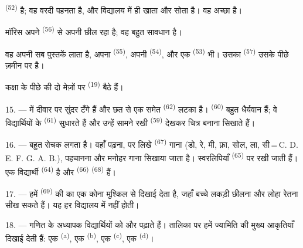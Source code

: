  \textsuperscript{(52)}  है; वह वरदी पहनता है,
और विद्यालय में ही खाता और सोता है। वह अच्छा  है।

मॉरिस अपने  \textsuperscript{(56)} से अपनी  छील रहा है;
वह बहुत सावधान है।

वह अपनी सब पुस्तकें लाता है, अपना  \textsuperscript{(55)}, अपनी
 \textsuperscript{(54)}, और एक 
\textsuperscript{(53)} भी। उसका  \textsuperscript{(57)} उसके पीछे ज़मीन पर
है।

कक्षा के पीछे की दो मेज़ों पर  \textsuperscript{(19)} बैठे
हैं।

\VUsaut{4.6mm}
\VUsaut{3.4mm}

15. ---  में दीवार पर सुंदर  टँगे हैं और
छत से एक  समेत  \textsuperscript{(62)} लटका है।
 \textsuperscript{(60)} बहुत धैर्यवान हैं; वे विद्यार्थियों के
 \textsuperscript{(61)} सुधारते हैं और उन्हें सामने रखी
 \textsuperscript{(59)} देखकर चित्र बनाना सिखाते हैं।

16. ---  बहुत रोचक लगता है। वहाँ  पढ़ना,
 पर लिखे  \textsuperscript{(67)} गाना (डो, रे, मी,
फ़ा, सोल, ला, सी\,=\,C. D. E. F. G. A. B.),  पहचानना और
मनोहर  गाना सिखाया जाता है। स्वरलिपियाँ 
\textsuperscript{(65)} पर रखी जाती हैं। एक विद्यार्थी 
\textsuperscript{(64)} है और  \textsuperscript{(66)}
 \textsuperscript{(68)} हैं।

17. --- हमें  \textsuperscript{(69)} की  का एक
कोना मुश्किल से दिखाई देता है, जहाँ बच्चे लकड़ी छीलना और लोहा रेतना सीख सकते
हैं। यह हर विद्यालय में नहीं होती।

\VUsaut{5.0mm}
\VUsaut{3.6mm}

18. --- गणित के अध्यापक विद्यार्थियों को  और
 पढ़ाते हैं। तालिका पर हमें ज्यामिति की मुख्य आकृतियाँ
दिखाई देती हैं: एक  \textsuperscript{(a)}, एक 
\textsuperscript{(b)}, एक  \textsuperscript{(c)}, एक 
\textsuperscript{(d)}।

